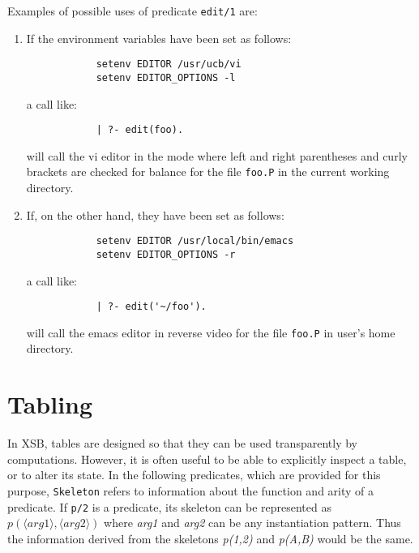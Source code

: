 \begin{description}
    Examples of possible uses of predicate {\tt edit/1} are:
    \begin{enumerate}
    \item If the environment variables have been set as follows:
          \begin{verbatim}
	        setenv EDITOR /usr/ucb/vi
	        setenv EDITOR_OPTIONS -l
          \end{verbatim}
          a call like:
          \begin{verbatim}
	        | ?- edit(foo).
          \end{verbatim}
          will call the vi editor in the mode where left and right parentheses
	  and curly brackets are checked for balance for the file {\tt foo.P}
	  in the current working directory.
    \item If, on the other hand, they have been set as follows:
          \begin{verbatim}
	        setenv EDITOR /usr/local/bin/emacs
	        setenv EDITOR_OPTIONS -r
          \end{verbatim}
          a call like:
          \begin{verbatim}
	        | ?- edit('~/foo').
          \end{verbatim}
          will call the emacs editor in reverse video for the file {\tt foo.P}
	  in user's home directory.
    \end{enumerate}

\end{description}



\section{Tabling} \label{tabling_predicates}

In XSB, tables are designed so that they can be used transparently by
computations.  However, it is often useful to be able to explicitly
inspect a table, or to alter its state.  In the following predicates,
which are provided for this purpose, {\tt Skeleton} refers to
information about the function and arity of a predicate.  If {\tt p/2}
is a predicate, its skeleton can be represented as {$p(\langle arg1
\rangle,\langle arg2 \rangle)$} where {\em arg1} and {\em arg2} can be
any instantiation pattern.  Thus the information derived from the
skeletons {\em p(1,2)} and {\em p(A,B)} would be the same.

